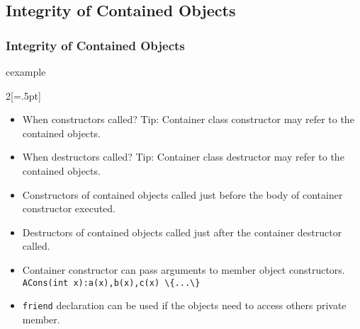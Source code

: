 \subsection{Integrity of Contained Objects}
\begin{frame}
\frametitle{Integrity of Contained Objects}
\begin{beamercolorbox}{cexample} \begin{multicols}{2}[\columnseprule=.5pt]
\codeCompCons \end{multicols}
\end{beamercolorbox}
\begin{itemize}
\item When constructors called? Tip: Container class constructor may refer to the contained
objects.
\item When destructors called? Tip: Container class destructor may refer to the contained
objects.
\end{itemize}
\end{frame}

\begin{frame}
\begin{itemize}
\item Constructors of contained objects called just before the body of container constructor
executed.
\item Destructors of contained objects called just after the container destructor called.
\item Container constructor can pass arguments to member object constructors.\\
	\lstinline!ACons(int x):a(x),b(x),c(x) \{...\}!
\item \lstinline!friend! declaration can be used if the objects need to access others private
member.
\end{itemize}
\end{frame}

